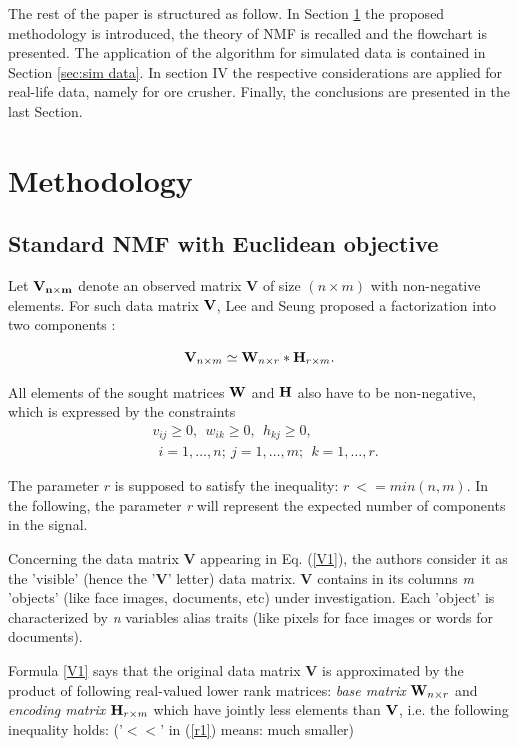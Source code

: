 \documentclass[journal]{IEEEtran}
\newcommand{\beq}{\begin{equation}}
\newcommand{\eeq}{\end{equation}}
\begin{document}
The rest of the paper is structured as follow. In Section \ref{sec:methodology} the proposed methodology is introduced, the theory of NMF is recalled and the flowchart is presented. The application of the algorithm for simulated data is contained in Section \ref{sec:sim data}. In section IV the respective considerations are applied for real-life data, namely for ore crusher. Finally, the conclusions are presented in the last Section.

\section{Methodology}
\label{sec:methodology}
\subsection{Standard NMF with Euclidean objective}

Let $\bf{V}_{n\times m}$ denote an observed matrix {\bf  V} of size $(n\times m)$ with non-negative elements. For such data matrix ${\bf V}$, Lee and Seung  proposed a factorization into two components \cite{lee2001algorithms}:

\beq\label{V1} {\bf V}_{n\times m}\simeq
      {\bf W}_{n\times r}*{\bf H}_{r\times m}. \eeq

All elements of the sought matrices ${\bf W}$ and ${\bf H}$ also have to be
non-negative, which is expressed by the constraints
\begin{align*}
    &v_{ij}\ge0,~~w_{ik}\ge 0,~~ h_{kj}\ge 0,\\
    &~~i=1, \dots, n; ~j=1,\dots, m;
                ~~k=1,\dots,r.
\end{align*}

The parameter $r$ is supposed to satisfy the inequality: \mbox{$r~<= min(n,m)$}.
In the following, the parameter \emph{r} will represent the expected number of components in the signal.


Concerning the data matrix \textbf{V} appearing in Eq. (\ref{V1}), the authors \cite{lee1999learning} consider it as the 'visible' (hence the '\textbf{V}' letter) data matrix. \textbf{V} contains in its columns \textit{m} 'objects' (like face images, documents, etc) under investigation. Each 'object' is characterized by \textit{n}
variables alias traits (like pixels for face images or words for documents).

Formula \ref{V1} says  that the original data matrix \textbf{V} is
approximated by the product of following real-valued lower rank matrices: \emph{base matrix} ${\bf W}_{n\times r}$ and \emph{encoding matrix} ${\bf H}_{r\times m}$  which have jointly less elements than ${\bf V}$, i.e. the following inequality holds:
('$< <$' in (\ref{r1}) means: much smaller)
\end{document}
